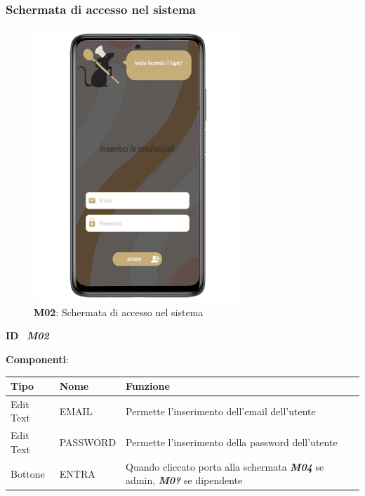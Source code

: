         \subsubsection{Schermata di accesso nel sistema}
            \begin{figure}[H]
                \centering
                \includegraphics[width=0.70\textwidth]{assets/Mockup/Mockup_Accesso.png}
                \caption{\textbf{M02}: Schermata di accesso nel sistema}
                \label{fig:Mockup_Login}
            \end{figure}
            \begin{flushleft}
                \textbf{ID} \ \Large{\textit{\textbf{M02}}}\\
            \end{flushleft}
            \textbf{Componenti}:\\
            \begin{tabular}{lll}
                \hline
                \textbf{Tipo}   &   \textbf{Nome}   &   \textbf{Funzione} \\
                \hline
                Edit Text       &   EMAIL &   Permette l'inserimento dell'email dell'utente \\
                \hline
                Edit Text & PASSWORD  &  Permette l'inserimento della password dell'utente  \\
                \hline
                Bottone &   ENTRA   & Quando cliccato porta alla schermata \textit{\textbf{M04}} se admin, \textit{\textbf{M0?}} se dipendente \\
                \hline
            \end{tabular}
        \newpage
